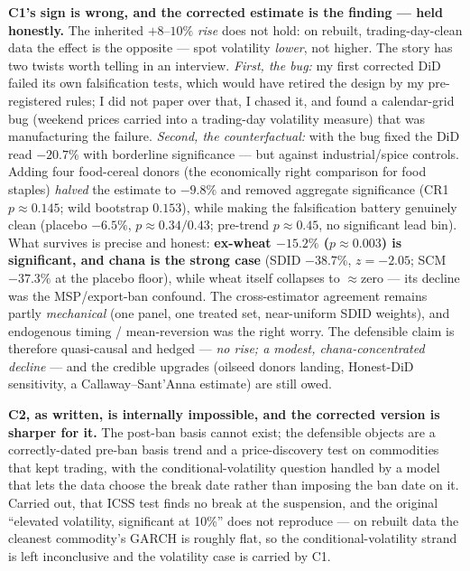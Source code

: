 \documentclass[11pt]{article}
\begin{document}
\smallskip\noindent\textbf{C1's sign is wrong, and the corrected estimate is the finding ---
held honestly.} The inherited $+8$--$10\%$ \emph{rise} does not hold: on rebuilt,
trading-day-clean data the effect is the opposite --- spot volatility \emph{lower}, not higher.
The story has two twists worth telling in an interview. \emph{First, the bug:} my first
corrected DiD failed its own falsification tests, which would have retired the design by my
pre-registered rules; I did not paper over that, I chased it, and found a calendar-grid bug
(weekend prices carried into a trading-day volatility measure) that was manufacturing the
failure. \emph{Second, the counterfactual:} with the bug fixed the DiD read $-20.7\%$ with
borderline significance --- but against industrial/spice controls. Adding four food-cereal
donors (the economically right comparison for food staples) \emph{halved} the estimate to
$-9.8\%$ and removed aggregate significance (CR1 $p\approx0.145$; wild bootstrap $0.153$),
while making the falsification battery genuinely clean (placebo $-6.5\%$, $p\approx0.34/0.43$;
pre-trend $p\approx0.45$, no significant lead bin). What survives is precise and honest:
\textbf{ex-wheat $-15.2\%$ ($p\approx0.003$) is significant, and chana is the strong case}
(SDID $-38.7\%$, $z=-2.05$; SCM $-37.3\%$ at the placebo floor), while wheat itself collapses
to $\approx$zero --- its decline was the MSP/export-ban confound. The cross-estimator agreement
remains partly \emph{mechanical} (one panel, one treated set, near-uniform SDID weights), and
endogenous timing / mean-reversion was the right worry. The defensible claim is therefore
quasi-causal and hedged --- \emph{no rise; a modest, chana-concentrated decline} --- and the
credible upgrades (oilseed donors landing, Honest-DiD sensitivity, a Callaway--Sant'Anna
estimate) are still owed.

\smallskip\noindent\textbf{C2, as written, is internally impossible, and the corrected version
is sharper for it.} The post-ban basis cannot exist; the defensible objects are a
correctly-dated pre-ban basis trend and a price-discovery test on commodities that kept
trading, with the conditional-volatility question handled by a model that lets the data choose
the break date rather than imposing the ban date on it. Carried out, that ICSS test finds no
break at the suspension, and the original ``elevated volatility, significant at 10\%'' does not
reproduce --- on rebuilt data the cleanest commodity's GARCH is roughly flat, so the
conditional-volatility strand is left inconclusive and the volatility case is carried by C1.
\end{document}
